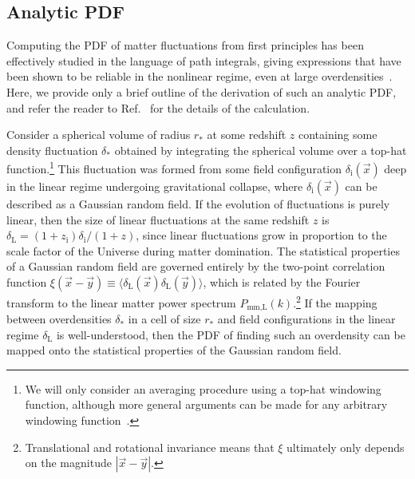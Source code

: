 \documentclass[prd,aps,10pt,nofootinbib,twocolumn,superscriptaddress,preprintnumbers,balancelastpage,longbibliography]{revtex4-1}
\begin{document}
\subsection{Analytic PDF}
\label{sec:PDFs_analytic_PDF}

Computing the PDF of matter fluctuations from first principles has been effectively studied in the language of path integrals, giving expressions that have been shown to be reliable in the nonlinear regime, even at large overdensities~\cite{Valageas:2001zr,Valageas:2001td,Matarrese:2000iz,Ivanov:2018lcg}. 
Here, we provide only a brief outline of the derivation of such an analytic PDF, and refer the reader to Ref.~\cite{Ivanov:2018lcg} for the details of the calculation.

Consider a spherical volume of radius $r_*$ at some redshift $z$ containing some density fluctuation $\delta_*$ obtained by integrating the spherical volume over a top-hat function.\footnote{We will only consider an averaging procedure using a top-hat windowing function, although more general arguments can be made for any arbitrary windowing function~\cite{Ivanov:2018lcg}.} 
This fluctuation was formed from some field configuration $\delta_\text{i}(\vec{x})$ deep in the linear regime undergoing gravitational collapse, where $\delta_\text{i}(\vec{x})$ can be described as a Gaussian random field. 
If the evolution of fluctuations is purely linear, then the size of linear fluctuations at the same redshift $z$ is $\delta_\text{L} = (1+z_\text{i}) \delta_\text{i} / (1 + z)$, since linear fluctuations grow in proportion to the scale factor of the Universe during matter domination.
The statistical properties of a Gaussian random field are governed entirely by the two-point correlation function $\xi(\vec{x} - \vec{y}) \equiv \langle \delta_\text{L}(\vec{x}) \delta_\text{L}(\vec{y}) \rangle$, which is related by the Fourier transform to the linear matter power spectrum $P_\text{mm,L}(k)$.\footnote{Translational and rotational invariance means that $\xi$ ultimately only depends on the magnitude $|\vec{x} - \vec{y}|$.} 
If the mapping between overdensities $\delta_*$ in a cell of size $r_*$ and field configurations in the linear regime $\delta_\text{L}$ is well-understood, then the PDF of finding such an overdensity can be mapped onto the statistical properties of the Gaussian random field. 
\end{document}
